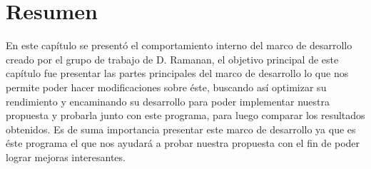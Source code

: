 \section{Resumen}\label{sec:summaryIV}

En este capítulo se presentó el comportamiento interno del marco de desarrollo creado por el grupo de trabajo de D. Ramanan, el objetivo principal de este capítulo fue presentar las partes principales del marco de desarrollo lo que nos permite poder hacer modificaciones sobre éste, buscando así optimizar su rendimiento y encaminando su desarrollo para poder implementar nuestra propuesta y probarla junto con este programa, para luego comparar los resultados obtenidos. Es de suma importancia presentar este marco de desarrollo ya que es éste programa el que nos ayudará a probar nuestra propuesta con el fin de poder lograr mejoras interesantes.



